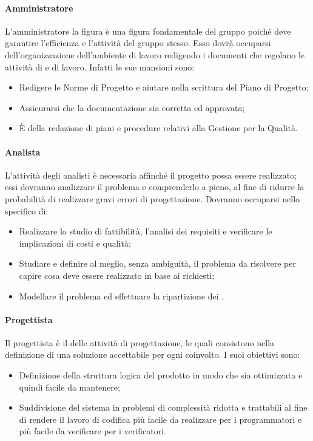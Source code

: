 \paragraph{Amministratore}
L’amministratore la figura è una figura fondamentale del gruppo poiché deve garantire l’efficienza e l’attività del gruppo stesso. Esso dovrà occuparsi dell’organizzazione dell’ambiente di lavoro redigendo i documenti che regolano le attività di  e di lavoro. Infatti le sue mansioni sono:
\begin{itemize}
    \item Redigere le Norme di Progetto e aiutare nella scrittura del Piano di Progetto;
    \item Assicurarsi che la documentazione sia corretta ed approvata;
    \item È  della redazione di piani e procedure relativi alla Gestione per la Qualità.
\end{itemize}

\paragraph{Analista}
L’attività degli analisti è necessaria affinché il progetto possa essere realizzato; essi dovranno analizzare il problema e comprenderlo a pieno, al fine di ridurre la probabilità di realizzare gravi errori di progettazione. Dovranno occuparsi nello specifico di:
\begin{itemize}
    \item Realizzare  lo studio di fattibilità, l’analisi dei requisiti e verificare le implicazioni di costi e qualità;
    \item Studiare e definire al meglio, senza ambiguità, il problema da risolvere per capire cosa deve essere realizzato in base ai  richiesti;
    \item Modellare il problema ed effettuare la ripartizione dei .
\end{itemize}

\paragraph{Progettista}
Il progettista è il  delle attività di progettazione, le quali consistono nella definizione di una soluzione accettabile per ogni  coinvolto. I suoi obiettivi sono:
\begin{itemize}

    \item Definizione della struttura logica del prodotto in modo che sia ottimizzata e quindi facile da mantenere;
    \item Suddivisione del sistema in problemi di complessità ridotta e trattabili al fine di rendere il lavoro di codifica più facile da realizzare per i programmatori e più facile da verificare per i verificatori.
\end{itemize}

